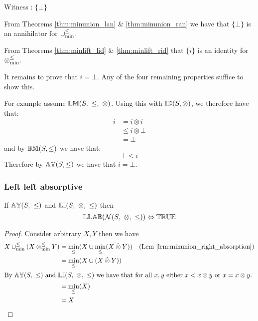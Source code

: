 \documentclass[../Summary.tex]{subfiles}
\begin{document}
\proof

\vspace{0.5em}
Witness : $\{ \bot \}$

\vspace{0.5em}

From Theorems \ref{thm:minunion_lan} \& \ref{thm:minunion_ran} we have that $\{ \bot \}$ is an annihilator for $\mathbin{\cup_{\min}^{\leq}}$.

\vspace{0.5em}

From Theorems \ref{thm:minlift_lid} \& \ref{thm:minlift_rid} that $\{ i \}$ is an identity for $\mathbin{\otimes_{\min}^{\leq}}$.

\vspace{0.5em}

It remains to prove that $i = \bot$. Any of the four remaining properties suffice to show this. 

\vspace{0.5em}

For example assume $\propname{LM}(S,\ \leq,\ \otimes)$. Using this with ${\mathbb{ID}}(S,\otimes)$, we therefore have that:
\begin{align*}
i 	& = i \otimes i \\
  	& \leq i \otimes \bot \\
  	& = \bot
\end{align*} 
and by ${\mathbb{BM}}(S,\leq)$ we have that:
\begin{equation*}
\bot \leq i
\end{equation*}
Therefore by ${\mathbb{AY}}(S,\leq)$ we have that $i = \bot$.



\subsubsection{Left left absorptive}

\begin{theorem} \label{thm:N_llab}
If ${\mathbb{AY}}(S,\ \leq)$ and ${\mathbb{LI}}(S,\ \otimes,\ \leq)$ then
\begin{equation*}
\propname{LLAB}(\mathcal{N}(S,\ \otimes,\ \leq)) \Leftrightarrow \propname{TRUE}
\end{equation*}
\end{theorem}

\begin{proof}

\vspace{0.5em}
Consider arbitrary $X, Y$ then we have
\begin{align*}
X \minunion (X \minlift Y) 	& = \min_\leq(X \cup \min_\leq(X \lift Y)) & \text{(Lem \ref{lem:minunion_right_absorption})} \\
							& = \min_\leq(X \cup (X \lift Y)) \\
\intertext{By $\propname{AY}(S,\ \leq)$ and $\propname{LI}(S,\ \otimes,\ \leq)$ we have that for all $x, y$ either $x < x \otimes y$ or $x = x \otimes y$.}
							& = \min_\leq(X) \\
							& = X
\end{align*}
\end{proof}
\end{document}

